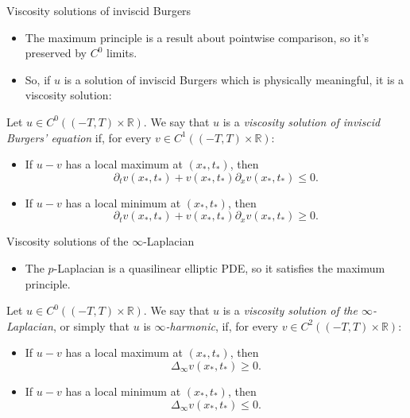 \documentclass[10pt]{beamer}
\newcommand{\RR}{\mathbb{R}}
\begin{document}
\begin{frame}{Viscosity solutions of inviscid Burgers}
\begin{itemize}
\item The maximum principle is a result about pointwise comparison, so it's preserved by $C^0$ limits. \pause
\item So, if $u$ is a solution of inviscid Burgers which is physically meaningful, it is a viscosity solution: \pause
\end{itemize}

\begin{definition}
Let $u \in C^0((-T, T) \times \RR)$. We say that $u$ is a \emph{viscosity solution of inviscid Burgers' equation} if, for every $v \in C^1((-T, T) \times \RR)$: \pause 
\begin{itemize}
\item If $u - v$ has a local maximum at $(x_*, t_*)$, then
$$\partial_t v(x_*, t_*) + v(x_*, t_*) \partial_x v(x_*, t_*) \leq 0.$$
\item If $u - v$ has a local minimum at $(x_*, t_*)$, then 
$$\partial_t v(x_*, t_*) + v(x_*, t_*) \partial_x v(x_*, t_*) \geq 0.$$
\end{itemize}
\end{definition}
\end{frame}

\begin{frame}{Viscosity solutions of the $\infty$-Laplacian}
\begin{itemize}
\item The $p$-Laplacian is a quasilinear elliptic PDE, so it satisfies the maximum principle. \pause 
\end{itemize}

\begin{definition}
Let $u \in C^0((-T, T) \times \RR)$. We say that $u$ is a \emph{viscosity solution of the $\infty$-Laplacian}, or simply that $u$ is \emph{$\infty$-harmonic}, if, for every $v \in C^2((-T, T) \times \RR)$: \pause 
\begin{itemize}
    \item If $u - v$ has a local maximum at $(x_*, t_*)$, then
    $$\Delta_\infty v(x_*, t_*) \geq 0.$$
    \item If $u - v$ has a local minimum at $(x_*, t_*)$, then 
    $$\Delta_\infty v(x_*, t_*) \leq 0.$$
\end{itemize}
\end{definition}
\end{frame}
\end{document}
